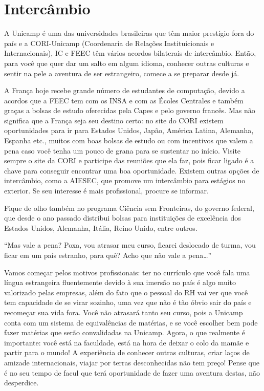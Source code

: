 
\section{Intercâmbio}

A Unicamp é uma das universidades brasileiras que têm maior prestígio fora do
país e a CORI-Unicamp (Coordenaria de Relações Instituicionais e
Internacionais), IC e FEEC têm vários acordos bilaterais de intercâmbio. Então,
para você que quer dar um salto em algum idioma, conhecer outras culturas e
sentir na pele a aventura de ser estrangeiro, comece a se preparar desde já.

A França hoje recebe grande número de estudantes de computação, devido a acordos
que a FEEC tem com os INSA e com as Écoles Centrales e também graças a bolsas de
estudo oferecidas pela Capes e pelo governo francês. Mas não significa que a
França seja seu destino certo: no site do CORI existem oportunidades para ir
para Estados Unidos, Japão, América Latina, Alemanha, Espanha etc., muitos com
boas bolsas de estudo ou com incentivos que valem a pena caso você tenha um
pouco de grana para se sustentar no início. Visite sempre o site da CORI e
participe das reuniões que ela faz, pois ficar ligado é a chave para conseguir
encontrar uma boa oportunidade. Existem outras opções de intercâmbio, como a
AIESEC, que promove um intercâmbio para estágios no exterior. Se seu interesse é
mais profissional, procure se informar.

Fique de olho também no programa Ciência sem Fronteiras, do governo federal, que
desde o ano passado distribui bolsas para instituições de excelência dos Estados
Unidos, Alemanha, Itália, Reino Unido, entre outros.

``Mas vale a pena? Poxa, vou atrasar meu curso, ficarei deslocado de turma, vou
ficar em um país estranho, para quê? Acho que não vale a pena{\dots}''

Vamos começar pelos motivos profissionais: ter no currículo que você fala uma
língua estrangeira fluentemente devido à sua imersão no país é algo muito
valorizado pelas empresas, além do fato que o pessoal do RH vai ver que você tem
capacidade de se virar sozinho, uma vez que não é tão óbvio sair do país e
recomeçar sua vida fora. Você não atrasará tanto seu curso, pois a Unicamp conta
com um sistema de equivalências de matérias, e se você escolher bem pode fazer
matérias que serão convalidadas na Unicamp. Agora, o que realmente é importante:
você está na faculdade, está na hora de deixar o colo da mamãe e partir para o
mundo! A experiência de conhecer outras culturas, criar laços de amizade
internacionais, viajar por terras desconhecidas não tem preço! Pense que é no
seu tempo de facul que terá oportunidade de fazer uma aventura destas, não
desperdice.

